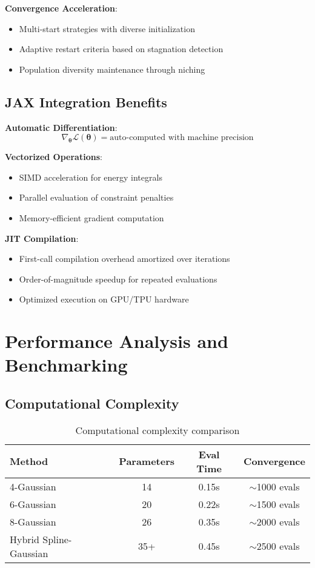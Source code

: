 \documentclass[11pt,a4paper]{article}
\begin{document}
\textbf{Convergence Acceleration}:
\begin{itemize}
\item Multi-start strategies with diverse initialization
\item Adaptive restart criteria based on stagnation detection
\item Population diversity maintenance through niching
\end{itemize}

\subsection{JAX Integration Benefits}

\textbf{Automatic Differentiation}:
\begin{equation}
\nabla_{\boldsymbol{\theta}} \mathcal{L}(\boldsymbol{\theta}) = \text{auto-computed with machine precision}
\end{equation}

\textbf{Vectorized Operations}:
\begin{itemize}
\item SIMD acceleration for energy integrals
\item Parallel evaluation of constraint penalties
\item Memory-efficient gradient computation
\end{itemize}

\textbf{JIT Compilation}:
\begin{itemize}
\item First-call compilation overhead amortized over iterations
\item Order-of-magnitude speedup for repeated evaluations
\item Optimized execution on GPU/TPU hardware
\end{itemize}

\section{Performance Analysis and Benchmarking}

\subsection{Computational Complexity}

\begin{table}[h]
\centering
\begin{tabular}{lccc}
\hline
Method & Parameters & Eval Time & Convergence \\
\hline
4-Gaussian & 14 & 0.15s & $\sim$1000 evals \\
6-Gaussian & 20 & 0.22s & $\sim$1500 evals \\
8-Gaussian & 26 & 0.35s & $\sim$2000 evals \\
Hybrid Spline-Gaussian & 35+ & 0.45s & $\sim$2500 evals \\
\hline
\end{tabular}
\caption{Computational complexity comparison}
\end{table}
\end{document}
